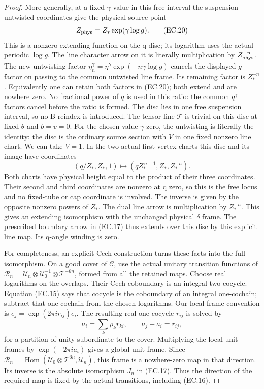 \begin{proof}
More generally, at a fixed \(\gamma\) value in this free interval the
suspension-untwisted coordinates give the physical source point
\[
             Z_{\rm phys}=Z_*\exp(\gamma\log g).
                                                        \tag{EC.20}
\]
This is a nonzero extending function on the q disc; its logarithm
uses the actual periodic \(\log g\). The line character arrow
on it is literally multiplication by \(Z_{\rm phys}^{-n}\).
The new untwisting factor
\(\eta_n^\gamma=\eta^\gamma\exp(-n\gamma\log g)\)
cancels the displayed \(g\) factor on passing to the common
untwisted line frame. Its remaining factor is \(Z_*^{-n}\).
Equivalently one can retain both factors in (EC.20); both extend
and are nowhere zero. No fractional power of \(q\) is used in
this ratio: the common \(q^\gamma\) factors cancel before the
ratio is formed. The disc lies in one free suspension interval,
so no B reindex is introduced. The tensor line \(\mathcal T\)
is trivial on this disc at fixed \(\theta\) and \(b=v=0\).
For the chosen value \(\gamma\) zero, the untwisting is literally the
identity: the disc is the ordinary source section with \(V\) in
one fixed nonzero line chart. We can take \(V=1\). In the two
actual first vertex charts this disc and its image have coordinates
\[
 (q/Z_*,Z_*,1)\longmapsto
                 (qZ_*^{\,n-1},Z_*,Z_*^{-n}).
                                                        \tag{EC.20a}
\]
Both charts have physical height equal to the product of their
three coordinates. Their second and third coordinates are nonzero
at q zero, so this is the free locus and no fixed-tube or cap
coordinate is involved. The inverse is given by the opposite
nonzero powers of \(Z_*\). The dual line arrow is multiplication
by \(Z_*^{-n}\). This gives an extending isomorphism
with the unchanged physical \(\delta\) frame. The prescribed boundary
arrow in (EC.17) thus extends over this disc by this explicit line
map. Its q-angle winding is zero.

For completeness, an explicit Cech construction turns these facts
into the full isomorphism. On a good cover of \(\mathcal C\), use
the actual unitary transition functions of
\(\mathcal R_n=\mathcal U_n\otimes\mathcal U_0^{-1}
\otimes\mathcal T^{-6n}\), formed from all the retained maps.
Choose real logarithms on the overlaps. Their Cech coboundary
is an integral two-cocycle. Equation (EC.15) says that cocycle
is the coboundary of an integral one-cochain; subtract that
one-cochain from the chosen logarithms. Our local frame convention
is \(e_j=\exp(2\pi i r_{ij})e_i\). The resulting real
one-cocycle \(r_{ij}\) is solved by
\[
                  a_i=\sum_k\rho_k r_{ki},\qquad
                  a_j-a_i=r_{ij},                    \tag{EC.21}
\]
for a partition of unity subordinate to the cover. Multiplying
the local unit frames by \(\exp(-2\pi i a_i)\) gives a global
unit frame. Since
\(\mathcal R_n=\operatorname{Hom}
(\mathcal U_0\otimes\mathcal T^{6n},\mathcal U_n)\),
this frame is a nowhere-zero map in that direction. Its inverse
is the absolute isomorphism \(J_n\) in (EC.17).
Thus the direction of the required map is fixed by the actual
transitions, including (EC.16).


\end{proof}
